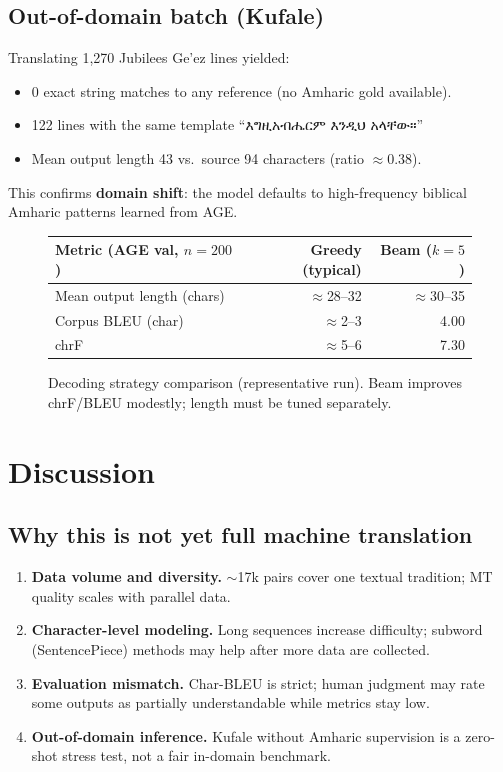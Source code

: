 \documentclass[11pt,a4paper]{article}
\begin{document}
\subsection{Out-of-domain batch (Kufale)}
Translating 1{,}270 Jubilees Ge'ez lines yielded:
\begin{itemize}
  \item 0 exact string matches to any reference (no Amharic gold available).
  \item 122 lines with the same template {\ethiopic ``እግዚአብሔርም እንዲህ አላቸው።''}
  \item Mean output length 43 vs.\ source 94 characters (ratio $\approx$0.38).
\end{itemize}
This confirms \textbf{domain shift}: the model defaults to high-frequency biblical Amharic patterns learned from AGE.

\begin{figure}[H]
  \centering
  \begin{tabular}{@{}lrr@{}}
    \toprule
    Metric (AGE val, $n{=}200$) & Greedy (typical) & Beam ($k{=}5$) \\
    \midrule
    Mean output length (chars) & $\approx$28--32 & $\approx$30--35 \\
    Corpus BLEU (char) & $\approx$2--3 & 4.00 \\
    chrF & $\approx$5--6 & 7.30 \\
    \bottomrule
  \end{tabular}
  \caption{Decoding strategy comparison (representative run). Beam improves chrF/BLEU modestly; length must be tuned separately.}
  \label{fig:beam}
\end{figure}

\section{Discussion}
\subsection{Why this is not yet full machine translation}
\begin{enumerate}
  \item \textbf{Data volume and diversity.} $\sim$17k pairs cover one textual tradition; MT quality scales with parallel data.
  \item \textbf{Character-level modeling.} Long sequences increase difficulty; subword (SentencePiece) methods may help after more data are collected.
  \item \textbf{Evaluation mismatch.} Char-BLEU is strict; human judgment may rate some outputs as partially understandable while metrics stay low.
  \item \textbf{Out-of-domain inference.} Kufale without Amharic supervision is a zero-shot stress test, not a fair in-domain benchmark.
\end{enumerate}
\end{document}
